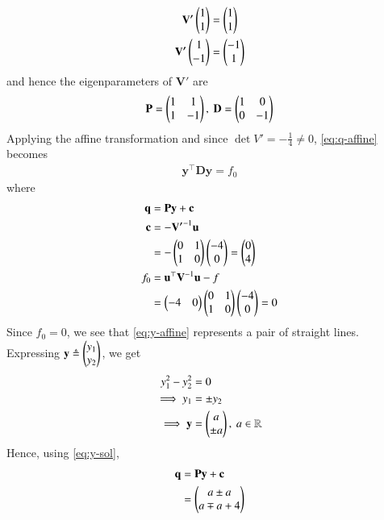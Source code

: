 \documentclass[journal,12pt,twocolumn]{IEEEtran}
\renewcommand{\vec}[1]{\boldsymbol{\mathbf{#1}}}
\begin{document}
\begin{enumerate}
\begin{align}
        \vec{V'}\myvec{1\\1} &= \myvec{1\\1} \label{eq:v1} \\
        \vec{V'}\myvec{1\\-1} &= \myvec{-1\\1} \label{eq:v2}
    \end{align}
    and hence the eigenparameters of $\vec{V'}$ are
    \begin{align}
        \vec{P} = \myvec{1&1\\1&-1},\ \vec{D} = \myvec{1&0\\0&-1}
    \end{align}
    Applying the affine transformation and since $\det{V'} = -\frac{1}{4} \neq 0$, 
    \eqref{eq:q-affine} becomes
    \begin{align}
        \vec{y}^\top\vec{Dy} = f_0
        \label{eq:y-affine}
    \end{align}
    where
    \begin{align}
        \vec{q} &= \vec{Py} + \vec{c} \\
        \vec{c} &= -\vec{V'}^{-1}\vec{u} \\
                &= -\myvec{0&1\\1&0}\myvec{-4\\0} = \myvec{0\\4} \\
        f_0 &= \vec{u}^\top\vec{V}^{-1}\vec{u} - f \\
            &= \myvec{-4&0}\myvec{0&1\\1&0}\myvec{-4\\0} = 0
    \end{align}
    Since $f_0 = 0$, we see that \eqref{eq:y-affine} represents a pair of straight lines.
    Expressing $\vec{y} \triangleq \myvec{y_1\\y_2}$, we get
    \begin{align}
        y_1^2-y_2^2 &= 0 \\
        \implies y_1 &= \pm y_2 \\
        \implies \vec{y} &= \myvec{a\\\pm a},\ a \in \mathbb{R}
        \label{eq:y-sol}
    \end{align}
    Hence, using \eqref{eq:y-sol},
    \begin{align}
        \vec{q} &= \vec{Py}+\vec{c} \\
                &= \myvec{a\pm a\\a\mp a+4} \\

\end{align}
\end{enumerate}
\end{document}
